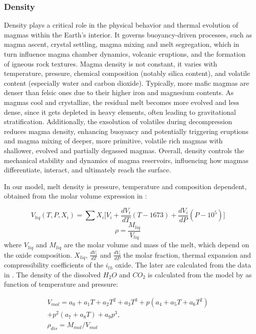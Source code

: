 \subsubsection{Density}
Density plays a critical role in the physical behavior and thermal evolution of magmas within the Earth's interior. It governs buoyancy-driven processes, such as magma ascent, crystal settling, magma mixing and melt segregation, which in turn influence magma chamber dynamics, volcanic eruptions, and the formation of igneous rock textures. Magma density is not constant, it varies with temperature, pressure, chemical composition (notably silica content), and volatile content (especially water and carbon dioxide). Typically, more mafic magmas are denser than felsic ones due to their higher iron and magnesium contents. As magmas cool and crystallize, the residual melt becomes more evolved and less dense, since it gets depleted in heavy elements, often leading to gravitational stratification. Additionally, the exsolution of volatiles during decompression reduces magma density, enhancing buoyancy and potentially triggering eruptions and magma mixing of deeper, more primitive, volatile rich magmas with shallower, evolved and partially degassed magmas. Overall, density controls the mechanical stability and dynamics of magma reservoirs, influencing how magmas differentiate, interact, and ultimately reach the surface.

In our model, melt density is pressure, temperature and composition dependent, obtained from the molar volume expression in \cite{lange1990}:

\begin{equation}
	V_{liq}(T,P,X_i) = \sum X_i \bigg[V_i + \frac{dV_i}{dT} (T-1673) + \frac{dV_i}{dP}(P-10^5)\bigg]
\end{equation}
\begin{equation}
	\rho = \frac{M_{liq}}{V_{liq}}
\end{equation}
where $V_{liq}$ and $M_{liq}$ are the molar volume and mass of the melt, which depend on the oxide composition. $X_{liq}$, $\frac{dV_i}{dT}$ and $ \frac{dV_i}{dP}$ the molar fraction, thermal expansion and compressibility coefficients of the $i_{th}$ oxide. The later are calculated from the data in \cite{lesher2015}.
The density of the dissolved $H_2O$ and $CO_2$ is calculated from the model by \cite{burnham1969} as function of temperature and pressure:

\begin{equation}
	\begin{aligned}
		V_{mol} = a_0 + a_1 T + a_2 T^2 + a_3 T^3 + p(a_4 + a_5 T + a_6 T^2) \\
		+ p^2 (a_7 + a_8 T) + a_9 p^3, \\
		\rho_{dis} = M_{mol} / V_{mol}
	\end{aligned}
\end{equation}

